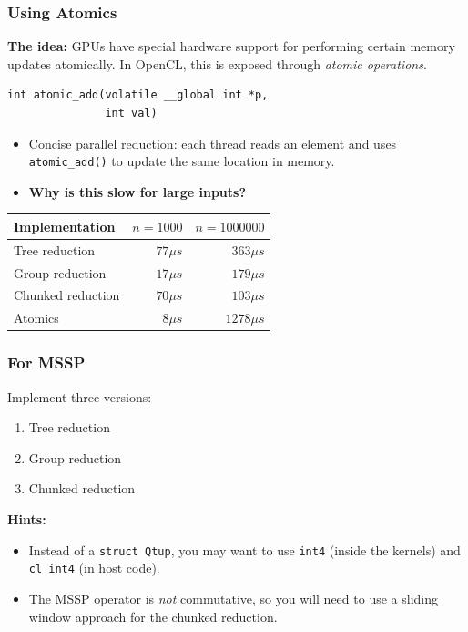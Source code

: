 \documentclass{beamer}
\begin{document}
\begin{frame}[fragile]
  \frametitle{Using Atomics}

  \textbf{The idea:} GPUs have special hardware support for performing
  certain memory updates atomically.  In OpenCL, this is exposed
  through \textit{atomic operations}.

\begin{lstlisting}[backgroundcolor=\color{lightgray}]
int atomic_add(volatile __global int *p,
               int val)
\end{lstlisting}

  \begin{itemize}
  \item Concise parallel reduction: each thread reads an element and
    uses \texttt{atomic\_add()} to update the same location in memory.
  \item \textbf{Why is this slow for large inputs?}
  \end{itemize}

\pause\bigskip

  \begin{tabular}{lrr}
    \textbf{Implementation} & $n=1000$ & $n=1000000$ \\\hline
    Tree reduction & $77\mu{}s$ & $363\mu{}s$ \\
    Group reduction & $17\mu{}s$ & $179\mu{}s$ \\
    Chunked reduction & $70\mu{}s$ & $103\mu{}s$ \\
    Atomics & $8\mu{}s$ & $1278\mu{}s$ \\
  \end{tabular}

\end{frame}

\begin{frame}
  \frametitle{For MSSP}

  Implement three versions:

  \begin{enumerate}
  \item Tree reduction
  \item Group reduction
  \item Chunked reduction
  \end{enumerate}

  \textbf{Hints:}
  \begin{itemize}
  \item Instead of a \texttt{struct Qtup}, you may want to use
    \texttt{int4} (inside the kernels) and \texttt{cl\_int4} (in host
    code).
  \item The MSSP operator is \textit{not} commutative, so you will
    need to use a sliding window approach for the chunked reduction.
  \end{itemize}

\end{frame}
\end{document}
